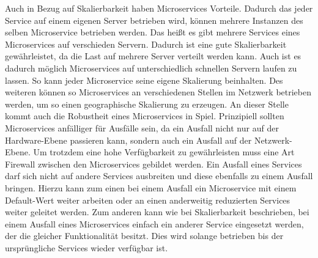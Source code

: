 Auch in Bezug auf Skalierbarkeit haben Microservices Vorteile. Dadurch das jeder Service auf einem eigenen Server betrieben wird, können mehrere Instanzen des selben Microservice betrieben werden. Das heißt es gibt mehrere Services eines Microservices auf verschieden Servern. Dadurch ist eine gute Skalierbarkeit gewährleistet, da die Last auf mehrere Server verteilt werden kann. Auch ist es dadurch möglich Microservices auf unterschiedlich schnellen Servern laufen zu lassen. So kann jeder Microservice seine eigene Skalierung beinhalten. Des weiteren können so Microservices an verschiedenen Stellen im Netzwerk betrieben werden, um so einen geographische Skalierung zu erzeugen.\newline 
An dieser Stelle kommt auch die Robustheit eines Microservices in Spiel. Prinzipiell sollten Microservices anfälliger für Ausfälle sein, da ein Ausfall nicht nur auf der Hardware-Ebene passieren kann, sondern auch ein Ausfall auf der Netzwerk-Ebene. Um trotzdem eine hohe Verfügbarkeit zu gewährleisten muss eine Art Firewall zwischen den Microservices gebildet werden. Ein Ausfall eines Services darf sich nicht auf andere Services ausbreiten und diese ebenfalls zu einem Ausfall bringen. Hierzu kann zum einen bei einem Ausfall ein Microservice mit einem Default-Wert weiter arbeiten oder an einen anderweitig reduzierten Services weiter geleitet werden. Zum anderen kann wie bei Skalierbarkeit beschrieben, bei einem Ausfall eines Microservices einfach ein anderer Service eingesetzt werden, der die gleicher Funktionalität besitzt. Dies wird solange betrieben bis der ursprüngliche Services wieder verfügbar ist.\cite{microservices}\newline\newline


